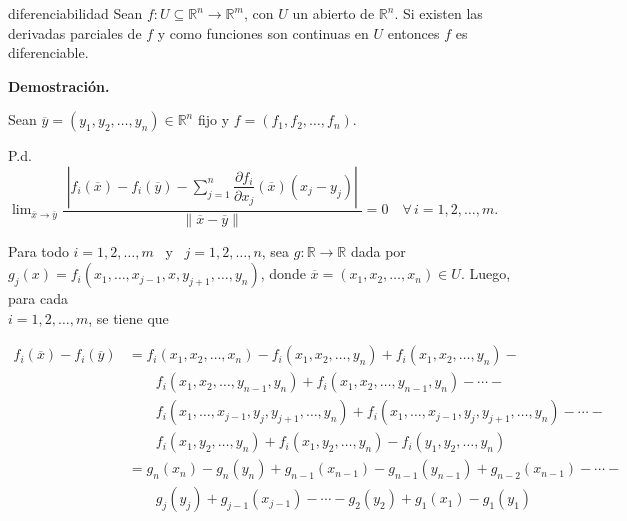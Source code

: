 \documentclass[fleqn, 12pt]{article}
\author{Osmar Dominique Santana Reyes}
\date{\today}
\newenvironment{ejercicio}[1]{\begin{ejer}[breakable, pad at break = 5mm, leftrule = 0.7mm, rightrule = 0.7mm, right = 2mm, left = 2mm, enlarge bottom finally by = 3mm]{}{#1}}{\end{ejer}}
\begin{document}
	\begin{ejercicio}{diferenciabilidad}
		Sean $ f: U \subseteq \mathbb{R}^n \to \mathbb{R}^m $, con $ U $ un abierto de $ \mathbb{R}^n $. Si existen las derivadas parciales de $ f $ y como funciones son continuas en $ U $ entonces $ f $ es diferenciable.

		\tcblower

		\textbf{Demostración.} \medskip

		Sean $ \overline{y} = \left( y_1, y_2, \ldots, y_n \right) \in \mathbb{R}^n $ fijo y $ f = \left( f_1, f_2, \ldots, f_n \right) $. \bigskip

		P.d. $ \displaystyle \lim_{\overline{x} \to \overline{y}} \dfrac{ \phantom{|} \left\lvert f_i(\overline{x}) - f_i(\overline{y}) - \displaystyle \sum_{j=1}^{n} \dfrac{ \partial f_i }{ \partial x_j } (\overline{x}) \left( x_j - y_j \right) \right\rvert \phantom{|} }{ \left\lVert \overline{x} - \overline{y} \right\rVert } = 0 \quad \forall \, i = 1, 2, \ldots, m $. \bigskip

		Para todo $ i = 1, 2, \ldots, m $ \, y \, $ j = 1, 2, \ldots, n $, sea $ g : \mathbb{R} \to \mathbb{R} $ dada por \\ $ g_j(x) = f_i\left( x_1, \ldots, x_{j-1}, x, y_{j+1}, \ldots, y_n \right) $, donde $ \overline{x} = \left( x_1, x_2, \ldots, x_n \right) \in U $. Luego, para cada \\ $ i = 1, 2, \ldots, m $, se tiene que 

		\begin{equation*}
			\begin{split}
				f_i(\overline{x}) - f_i(\overline{y}) &= f_i\left( x_1, x_2, \ldots, x_n \right) - f_i\left( x_1, x_2, \ldots, y_n \right) + f_i\left( x_1, x_2, \ldots, y_n \right) - \\
				& \qquad f_i\left( x_1, x_2, \ldots, y_{n-1}, y_n \right) + f_i\left( x_1, x_2, \ldots, y_{n-1}, y_n \right) - \cdots - \\
				& \qquad f_i\left( x_1, \ldots, x_{j-1}, y_j, y_{j+1}, \ldots, y_n \right) + f_i\left( x_1, \ldots, x_{j-1}, y_j, y_{j+1}, \ldots, y_n \right) - \cdots - \\
				& \qquad f_i\left( x_1, y_2, \ldots, y_n \right) + f_i\left( x_1, y_2, \ldots, y_n \right) - f_i\left( y_1, y_2, \ldots, y_n \right) \\
				&= g_n(x_n) - g_n(y_n) + g_{n-1}(x_{n-1}) - g_{n-1}(y_{n-1}) + g_{n-2}(x_{n-1}) - \cdots - \\
				& \qquad g_j(y_j) + g_{j-1}(x_{j-1}) - \cdots - g_2(y_2) + g_1(x_1) - g_1(y_1)
			\end{split}
		\end{equation*}


\end{ejercicio}
\end{document}
